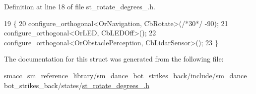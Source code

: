 Definition at line 18 of file st\+\_\+rotate\+\_\+degrees\+\_.\+h.


\begin{DoxyCode}
19   \{
20     configure\_orthogonal<OrNavigation, CbRotate>(\textcolor{comment}{/*30*/} -90);
21     configure\_orthogonal<OrLED, CbLEDOff>();
22     configure\_orthogonal<OrObstaclePerception, CbLidarSensor>();
23   \}
\end{DoxyCode}


The documentation for this struct was generated from the following file\+:\begin{DoxyCompactItemize}
\item 
smacc\+\_\+sm\+\_\+reference\+\_\+library/sm\+\_\+dance\+\_\+bot\+\_\+strikes\+\_\+back/include/sm\+\_\+dance\+\_\+bot\+\_\+strikes\+\_\+back/states/\hyperlink{strikes__back_2include_2sm__dance__bot__strikes__back_2states_2st__rotate__degrees__2_8h}{st\+\_\+rotate\+\_\+degrees\+\_.\+h}\end{DoxyCompactItemize}
